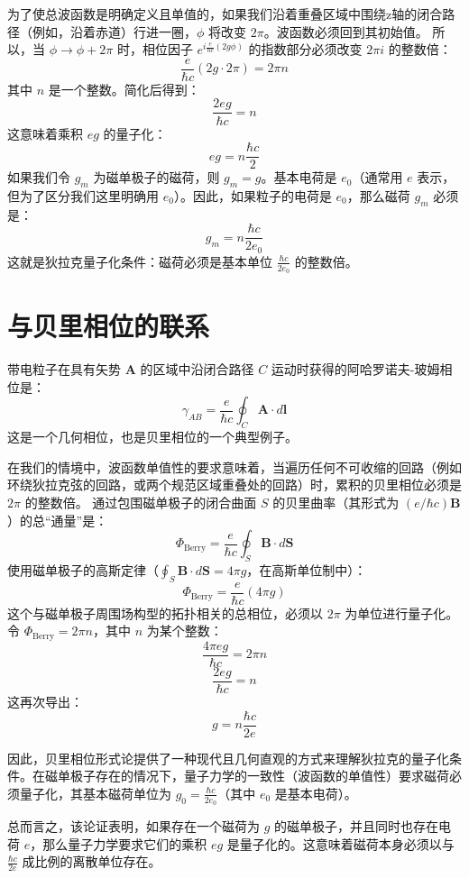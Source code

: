 \documentclass{article}
\begin{document}
为了使总波函数是明确定义且单值的，如果我们沿着重叠区域中围绕z轴的闭合路径（例如，沿着赤道）行进一圈，\(\phi\) 将改变 \(2\pi\)。波函数必须回到其初始值。
所以，当 \(\phi \rightarrow \phi + 2\pi\) 时，相位因子 \(e^{i \frac{e}{\hbar c} (2g\phi)}\) 的指数部分必须改变 \(2\pi i\) 的整数倍：
\[ \frac{e}{\hbar c} (2g \cdot 2\pi) = 2\pi n \]
其中 \(n\) 是一个整数。简化后得到：
\[ \frac{2eg}{\hbar c} = n \]
这意味着乘积 \(eg\) 的量子化：
\[ eg = n \frac{\hbar c}{2} \]
如果我们令 \(g_m\) 为磁单极子的磁荷，则 \(g_m = g\)。基本电荷是 \(e_0\)（通常用 \(e\) 表示，但为了区分我们这里明确用 \(e_0\)）。因此，如果粒子的电荷是 \(e_0\)，那么磁荷 \(g_m\) 必须是：
\[ g_m = n \frac{\hbar c}{2e_0} \]
这就是狄拉克量子化条件：磁荷必须是基本单位 \(\frac{\hbar c}{2e_0}\) 的整数倍。

\section{与贝里相位的联系}

带电粒子在具有矢势 \(\mathbf{A}\) 的区域中沿闭合路径 \(C\) 运动时获得的阿哈罗诺夫-玻姆相位是：
\[ \gamma_{AB} = \frac{e}{\hbar c} \oint_C \mathbf{A} \cdot d\mathbf{l} \]
这是一个几何相位，也是贝里相位的一个典型例子。

在我们的情境中，波函数单值性的要求意味着，当遍历任何不可收缩的回路（例如环绕狄拉克弦的回路，或两个规范区域重叠处的回路）时，累积的贝里相位必须是 \(2\pi\) 的整数倍。
通过包围磁单极子的闭合曲面 \(S\) 的贝里曲率（其形式为 \((e/\hbar c)\mathbf{B}\)）的总“通量”是：
\[ \Phi_{\text{Berry}} = \frac{e}{\hbar c} \oint_S \mathbf{B} \cdot d\mathbf{S} \]
使用磁单极子的高斯定律（\(\oint_S \mathbf{B} \cdot d\mathbf{S} = 4\pi g\)，在高斯单位制中）：
\[ \Phi_{\text{Berry}} = \frac{e}{\hbar c} (4\pi g) \]
这个与磁单极子周围场构型的拓扑相关的总相位，必须以 \(2\pi\) 为单位进行量子化。
令 \(\Phi_{\text{Berry}} = 2\pi n\)，其中 \(n\) 为某个整数：
\[ \frac{4\pi eg}{\hbar c} = 2\pi n \]
\[ \frac{2eg}{\hbar c} = n \]
这再次导出：
\[ g = n \frac{\hbar c}{2e} \]

因此，贝里相位形式论提供了一种现代且几何直观的方式来理解狄拉克的量子化条件。在磁单极子存在的情况下，量子力学的一致性（波函数的单值性）要求磁荷必须量子化，其基本磁荷单位为 \(g_0 = \frac{\hbar c}{2e_0}\)（其中 \(e_0\) 是基本电荷）。

总而言之，该论证表明，如果存在一个磁荷为 \(g\) 的磁单极子，并且同时也存在电荷 \(e\)，那么量子力学要求它们的乘积 \(eg\) 是量子化的。这意味着磁荷本身必须以与 \(\frac{\hbar c}{2e}\) 成比例的离散单位存在。
\end{document}
